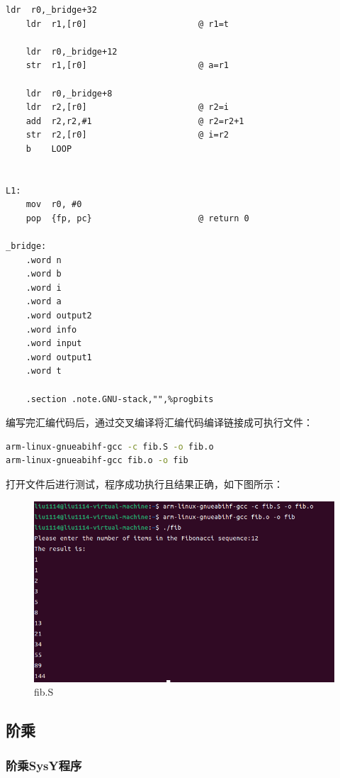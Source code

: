 \documentclass[UTF8,a4paper,10pt]{ctexart}
\begin{document}
\begin{lstlisting}[frame=trbl,title=斐波那契数列ARM汇编代码]
    ldr  r0,_bridge+32
    ldr  r1,[r0]                      @ r1=t

    ldr  r0,_bridge+12
    str  r1,[r0]                      @ a=r1

    ldr  r0,_bridge+8
    ldr  r2,[r0]                      @ r2=i
    add  r2,r2,#1                     @ r2=r2+1
    str  r2,[r0]                      @ i=r2
    b    LOOP


L1:
    mov  r0, #0
    pop  {fp, pc}                     @ return 0

_bridge:
    .word n        
    .word b
    .word i     
    .word a
    .word output2
    .word info
    .word input
    .word output1
    .word t

    .section .note.GNU-stack,"",%progbits 
\end{lstlisting}
编写完汇编代码后，通过交叉编译将汇编代码编译链接成可执行文件：
\begin{lstlisting}[frame=trbl,language=sh]
arm-linux-gnueabihf-gcc -c fib.S -o fib.o
arm-linux-gnueabihf-gcc fib.o -o fib
\end{lstlisting}
打开文件后进行测试，程序成功执行且结果正确，如下图所示：
\begin{figure}[H]
    \centering
\includegraphics[width=1.0\textwidth]{img/fib_arm.png}
    \caption{fib.S}
\end{figure}
\subsection{阶乘}

\subsubsection{阶乘SysY程序}
\end{document}
